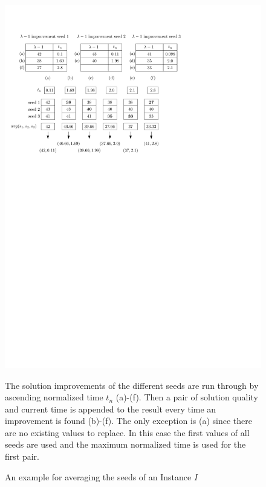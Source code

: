 \documentclass[a4paper,12pt,titlepage, BCOR7mm,headsepline]{scrbook}
\numberwithin{equation}{section}
\begin{document}
\begin{figure}[H] 
    
  \begin{center}
   \includegraphics[width=.9\textwidth]{Ipe/seed_averaging_example.pdf}
  \caption{An example for averaging the seeds of an Instance $I$}\label{fig:averagingseeds} %
  \end{center}
    The solution improvements of the different seeds are run through by ascending normalized time $t_n$ (a)-(f). Then a pair of solution quality and current time is appended to the result every time an improvement is found (b)-(f). The only exception is (a) since there are no existing values to replace. In this case the first values of all seeds are used and the maximum normalized time is used for the first pair.
\end{figure}
\end{document}
